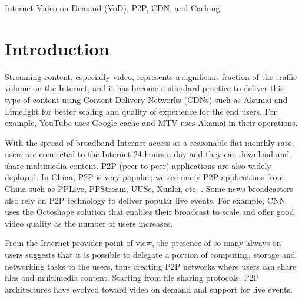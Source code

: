\documentclass[10pt,final,journal,a4paper]{IEEEtran}
\begin{document}
\begin{IEEEkeywords}
Internet Video on Demand (VoD), P2P, CDN, and Caching.
\end{IEEEkeywords}





%



\section{Introduction}
Streaming content, especially video, represents a significant fraction of the traffic volume on the Internet, and it has become a standard practice to deliver this type of content using Content Delivery Networks (CDNs) such as Akamai and Limelight for better scaling and quality of experience for the end users. 
For example, YouTube uses Google cache and MTV uses Akamai in their operations.

With the spread of broadband Internet access at a reasonable flat monthly rate, users are connected to the Internet 24 hours a day and they can download and share multimedia content. P2P (peer to peer) applications are also widely deployed. 
In China, P2P is very popular; we see many P2P applications from China such as PPLive, PPStream, UUSe, Xunlei, etc. \cite{Vu:2010:UOC:1865106.1865115}. 
Some news broadcasters also rely on P2P technology to deliver popular live events. 
For example, CNN uses the Octoshape \cite{octoshape} solution that enables their broadcast to scale and offer good video quality as the number of users increases.

From the Internet provider point of view, the presence of so many always-on users suggests that it is possible to delegate a portion of computing, storage and networking tasks to the users, thus creating P2P networks where users can share files and multimedia content. 
Starting from file sharing protocols, P2P architectures have evolved toward video on demand and support for live events.
\end{document}
